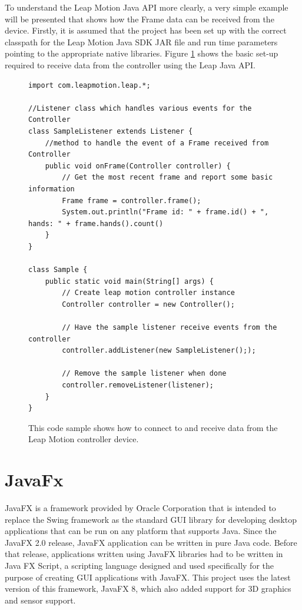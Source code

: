 To understand the Leap Motion Java API more clearly, a very simple example will be presented that shows how the Frame data can be received from the device. Firstly, it is assumed that the project has been set up with the correct classpath for the Leap Motion Java SDK JAR file and run time parameters pointing to the appropriate native libraries. Figure \ref{fig:leapMotionSample} shows the basic set-up required to receive data from the controller using the Leap Java API. 

\begin{figure}[th]
\centering
\begin{lstlisting}
import com.leapmotion.leap.*;

//Listener class which handles various events for the Controller
class SampleListener extends Listener {
    //method to handle the event of a Frame received from Controller
    public void onFrame(Controller controller) {
        // Get the most recent frame and report some basic information
        Frame frame = controller.frame();
        System.out.println("Frame id: " + frame.id() + ", hands: " + frame.hands().count()
    }
}

class Sample {
    public static void main(String[] args) {
        // Create leap motion controller instance
        Controller controller = new Controller();

        // Have the sample listener receive events from the controller
        controller.addListener(new SampleListener(););

        // Remove the sample listener when done
        controller.removeListener(listener);
    }
}
\end{lstlisting}
\caption[Leap Motion Sample]{This code sample shows how to connect to and receive data from the Leap Motion controller device.}
\label{fig:leapMotionSample}
\end{figure}






\section{JavaFx}

JavaFX is a framework provided by Oracle Corporation that is intended to replace the Swing framework as the standard GUI library for developing desktop applications that can be run on any platform that supports Java. Since the JavaFX 2.0 release, JavaFX application can be written in pure Java code. Before that release, applications written using JavaFX libraries had to be written in Java FX Script, a scripting language designed and used specifically for the purpose of creating GUI applications with JavaFX. This project uses the latest version of this framework, JavaFX 8, which also added support for 3D graphics and sensor support. 


